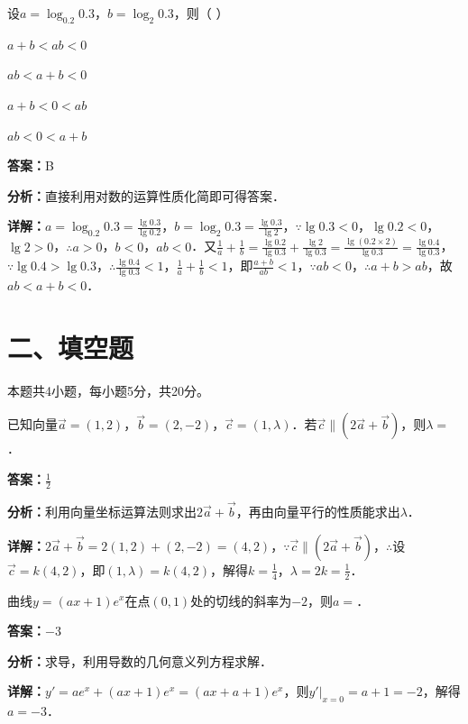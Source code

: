 \begin{question}[points=5]
设$a=\log_{0.2}0.3$，$b=\log_2 0.3$，则（ ）
\begin{choices}
  \item $a+b<ab<0$
  \item $ab<a+b<0$
  \item $a+b<0<ab$
  \item $ab<0<a+b$
\end{choices}
\begin{solution}
\textbf{答案：}B

\textbf{分析：}直接利用对数的运算性质化简即可得答案．

\textbf{详解：}$a=\log_{0.2}0.3=\frac{\lg0.3}{\lg0.2}$，$b=\log_2 0.3=\frac{\lg0.3}{\lg2}$，$\because \lg0.3<0$，$\lg0.2<0$，$\lg2>0$，$\therefore a>0$，$b<0$，$ab<0$．又$\frac{1}{a}+\frac{1}{b}=\frac{\lg0.2}{\lg0.3}+\frac{\lg2}{\lg0.3}=\frac{\lg(0.2\times2)}{\lg0.3}=\frac{\lg0.4}{\lg0.3}$，$\because \lg0.4>\lg0.3$，$\therefore \frac{\lg0.4}{\lg0.3}<1$，$\frac{1}{a}+\frac{1}{b}<1$，即$\frac{a+b}{ab}<1$，$\because ab<0$，$\therefore a+b>ab$，故$ab<a+b<0$．
\end{solution}
\end{question}

\section*{二、填空题}
本题共4小题，每小题5分，共20分。

\begin{question}[points=5]
已知向量$\vec{a}=(1,2)$，$\vec{b}=(2,-2)$，$\vec{c}=(1,\lambda)$．若$\vec{c}\parallel(2\vec{a}+\vec{b})$，则$\lambda=$．
\fillin[{$\frac{1}{2}$}]
\begin{solution}
\textbf{答案：}$\frac{1}{2}$

\textbf{分析：}利用向量坐标运算法则求出$2\vec{a}+\vec{b}$，再由向量平行的性质能求出$\lambda$．

\textbf{详解：}$2\vec{a}+\vec{b}=2(1,2)+(2,-2)=(4,2)$，$\because \vec{c}\parallel(2\vec{a}+\vec{b})$，$\therefore$设$\vec{c}=k(4,2)$，即$(1,\lambda)=k(4,2)$，解得$k=\frac{1}{4}$，$\lambda=2k=\frac{1}{2}$．
\end{solution}
\end{question}

\begin{question}[points=5]
曲线$y=(ax+1)e^x$在点$(0,1)$处的切线的斜率为$-2$，则$a=$．
\fillin[{$-3$}]
\begin{solution}
\textbf{答案：}$-3$

\textbf{分析：}求导，利用导数的几何意义列方程求解．

\textbf{详解：}$y'=ae^x+(ax+1)e^x=(ax+a+1)e^x$，则$y'|_{x=0}=a+1=-2$，解得$a=-3$．
\end{solution}
\end{question}

